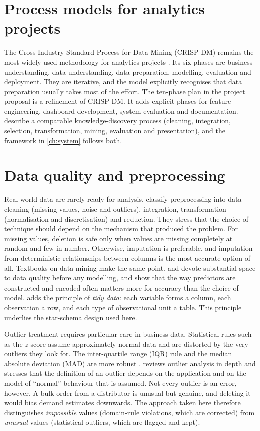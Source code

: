 \section{Process models for analytics projects}
The Cross-Industry Standard Process for Data Mining (CRISP-DM) remains the most widely used methodology for
analytics projects \citep{shearer2000}. Its six phases are business understanding, data understanding, data
preparation, modelling, evaluation and deployment. They are iterative, and the model explicitly recognises that
data preparation usually takes most of the effort. The ten-phase plan in the project proposal is a refinement
of CRISP-DM. It adds explicit phases for feature engineering, dashboard development, system evaluation and
documentation. \citet{han2012} describe a comparable knowledge-discovery process (cleaning, integration,
selection, transformation, mining, evaluation and presentation), and the framework in \cref{ch:system} follows
both.

\section{Data quality and preprocessing}
Real-world data are rarely ready for analysis. \citet{garcia2015} classify preprocessing into data cleaning
(missing values, noise and outliers), integration, transformation (normalisation and discretisation) and
reduction. They stress that the choice of technique should depend on the mechanism that produced the problem.
For missing values, deletion is safe only when values are missing completely at random and few in number.
Otherwise, imputation is preferable, and imputation from deterministic relationships between columns is the
most accurate option of all. Textbooks on data mining make the same point. \citet{tan2019} and
\citet{witten2017} devote substantial space to data quality before any modelling, and \citet{kuhn2019} show
that the way predictors are constructed and encoded often matters more for accuracy than the choice of model.
\citet{wickham2014} adds the principle of \emph{tidy data}: each variable forms a
column, each observation a row, and each type of observational unit a table. This principle underlies the
star-schema design used here.

Outlier treatment requires particular care in business data. Statistical rules such as the $z$-score assume
approximately normal data and are distorted by the very outliers they look for. The inter-quartile range (IQR)
rule and the median absolute deviation (MAD) are more robust \citep{han2012}. \citet{aggarwal2017} reviews
outlier analysis in depth and stresses that the definition of an outlier depends on the application and on the
model of ``normal'' behaviour that is assumed. Not every outlier is an error,
however. A bulk order from a distributor is unusual but genuine, and deleting it would bias demand estimates
downwards. The approach taken here therefore distinguishes \emph{impossible} values (domain-rule violations,
which are corrected) from \emph{unusual} values (statistical outliers, which are flagged and kept).

